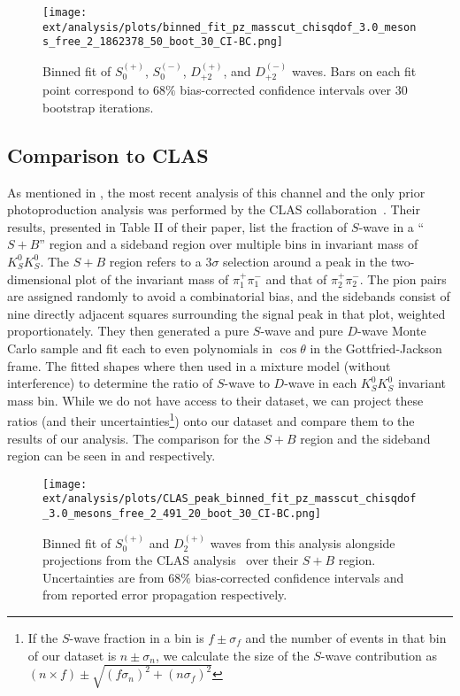 \begin{figure}
  \begin{center}
    \texttt{[image: ext/analysis/plots/binned\_fit\_pz\_masscut\_chisqdof\_3.0\_mesons\_free\_2\_1862378\_50\_boot\_30\_CI-BC.png]}
  \end{center}
  \caption{Binned fit of $S_{0}^{(+)}$, $S_{0}^{(-)}$, $D_{+2}^{(+)}$, and $D_{+2}^{(-)}$ waves. Bars on each fit point correspond to $68\%$ bias-corrected confidence intervals over $ 30 $ bootstrap iterations.}\label{fig:binned-fit-chisqdof-3.0-Spn-D2pn}
\end{figure}

\subsection{Comparison to CLAS}\label{sub:comparison-to-clas}
As mentioned in , the most recent analysis of this channel and the only prior photoproduction analysis was performed by the CLAS collaboration~\cite{Chandavar2018}. Their results, presented in Table II of their paper, list the fraction of $S$-wave in a ``$S+B$'' region and a sideband region over multiple bins in invariant mass of $K_S^0K_S^0$. The $S+B$ region refers to a $3\sigma$ selection around a peak in the two-dimensional plot of the invariant mass of $\pi_1^+\pi_1^-$ and that of $\pi_2^+\pi_2^-$. The pion pairs are assigned randomly to avoid a combinatorial bias, and the sidebands consist of nine directly adjacent squares surrounding the signal peak in that plot, weighted proportionately. They then generated a pure $S$-wave and pure $D$-wave Monte Carlo sample and fit each to even polynomials in $\cos\theta$ in the Gottfried-Jackson frame. The fitted shapes where then used in a mixture model (without interference) to determine the ratio of $S$-wave to $D$-wave in each $K_S^0K_S^0$ invariant mass bin. While we do not have access to their dataset, we can project these ratios (and their uncertainties\footnote{If the $S$-wave fraction in a bin is $f\pm\sigma_f$ and the number of events in that bin of our dataset is $n\pm\sigma_n$, we calculate the size of the $S$-wave contribution as $(n\times f) \pm \sqrt{(f\sigma_n)^2 + (n\sigma_f)^2}$}) onto our dataset and compare them to the results of our analysis. The comparison for the $S+B$ region and the sideband region can be seen in  and  respectively.

\begin{figure}
  \begin{center}
    \texttt{[image: ext/analysis/plots/CLAS\_peak\_binned\_fit\_pz\_masscut\_chisqdof\_3.0\_mesons\_free\_2\_491\_20\_boot\_30\_CI-BC.png]}
  \end{center}
  \caption{Binned fit of $S_0^{(+)}$ and $D_2^{(+)}$ waves from this analysis alongside projections from the CLAS analysis~\cite{Chandavar2018} over their $S+B$ region. Uncertainties are from $68\%$ bias-corrected confidence intervals and from reported error propagation respectively.}\label{fig:clas-comparison-SB}
\end{figure}

